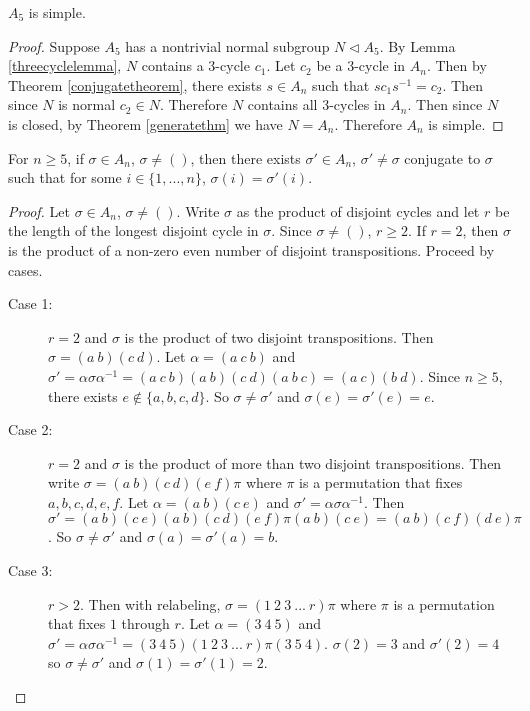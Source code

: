 \documentclass[a4paper]{article}
\begin{document}
\begin{theorem}
\label{a5theorem}
$A_5$ is simple.
\end{theorem}
\begin{proof}
Suppose $A_5$ has a nontrivial normal subgroup $N \triangleleft A_5$. By Lemma \ref{threecyclelemma}, $N$ contains a 3-cycle $c_1$. Let $c_2$ be a 3-cycle in $A_n$. Then by Theorem \ref{conjugatetheorem}, there exists $s \in A_n$ such that $s c_1 s^{-1} = c_2$. Then since $N$ is normal $c_2 \in N$. Therefore $N$ contains all 3-cycles in $A_n$. Then since $N$ is closed, by Theorem \ref{generatethm} we have $N = A_n$. Therefore $A_n$ is simple.
\end{proof}

\begin{lemma}
\label{fixedpointlemma}
For $n \ge 5$, if $\sigma \in A_n$, $\sigma \ne ()$, then there exists $\sigma' \in A_n$, $\sigma' \ne \sigma$ conjugate to $\sigma$ such that for some $i \in \{1, ..., n\}$, $\sigma(i) = \sigma'(i)$.
\end{lemma}
\begin{proof}
Let $\sigma \in A_n$, $\sigma \ne ()$. Write $\sigma$ as the product of disjoint cycles and let $r$ be the length of the longest disjoint cycle in $\sigma$. Since $\sigma \ne ()$, $r \ge 2$. If $r = 2$, then $\sigma$ is the product of a non-zero even number of disjoint transpositions. Proceed by cases.
\begin{description}
	\item[Case 1:]$r = 2$ and $\sigma$ is the product of two disjoint transpositions.
	Then $\sigma = (a\ b)(c\ d)$. Let $\alpha = (a\ c\ b)$ and $\sigma' = \alpha \sigma \alpha^{-1} = (a\ c\ b)(a\ b)(c\ d)(a\ b\ c) = (a\ c)(b\ d)$. Since $n \ge 5$, there exists $e \notin \{a, b, c, d\}$. So $\sigma \ne \sigma'$ and $\sigma(e) = \sigma'(e) = e$.
	\item[Case 2:]$r = 2$ and $\sigma$ is the product of more than two disjoint transpositions.
	Then write $\sigma = (a\ b)(c\ d)(e\ f)\pi$ where $\pi$ is a permutation that fixes $a, b, c, d, e, f$. Let $\alpha = (a\ b)(c\ e)$ and $\sigma' = \alpha \sigma \alpha^{-1}$. Then $\sigma' = (a\ b)(c\ e)(a\ b)(c\ d)(e\ f)\pi(a\ b)(c\ e) = (a\ b)(c\ f)(d\ e)\pi$. So $\sigma \ne \sigma'$ and $\sigma(a) = \sigma'(a) = b$.
	\item[Case 3:]$r > 2$.
	Then with relabeling, $\sigma = (1\ 2\ 3\ ...\ r)\pi$ where $\pi$ is a permutation that fixes $1$ through $r$. Let $\alpha = (3\ 4\ 5)$ and $\sigma' = \alpha \sigma \alpha^{-1} = (3\ 4\ 5)(1\ 2\ 3\ ...\ r)\pi(3\ 5\ 4)$. $\sigma(2) = 3$ and $\sigma'(2) = 4$ so $\sigma \ne \sigma'$ and $\sigma(1) = \sigma'(1) = 2$.
\end{description}
\end{proof}
\end{document}
